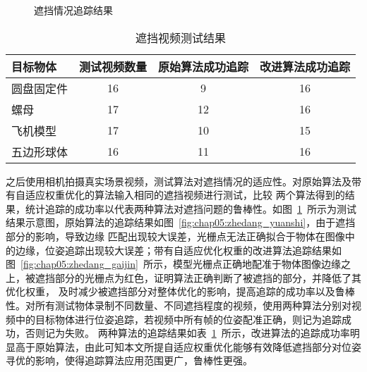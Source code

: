     \begin{figure}[t] %
        \centering%
          \vskip0.3cm
        \caption{遮挡情况追踪结果}
        \label{fig:chap05:result_zhedang_diff}
        \end{figure}
    
        \begin{table}[t]
            \centering
            \caption{遮挡视频测试结果}
            \label{table:chap05:track_able_rate}
            \begin{tabular}{lccc}
                \toprule
                目标物体 &  测试视频数量 & 原始算法成功追踪   &改进算法成功追踪 \\
                \midrule
                圆盘固定件   & 16 & 9 & 16 \\ 
                螺母  & 17 & 12 & 16 \\ 
                飞机模型  & 17 & 10 & 15 \\ 
                五边形球体  & 16 & 11 & 16 \\ 
                \bottomrule
            \end{tabular}
            \end{table}

之后使用相机拍摄真实场景视频，测试算法对遮挡情况的适应性。对原始算法及带有自适应权重优化的算法输入相同的遮挡视频进行测试，比较
两个算法得到的结果，统计追踪的成功率以代表两种算法对遮挡问题的鲁棒性。如图~\ref{fig:chap05:result_zhedang_diff}~所示为测试结果示意图，原始算法的追踪结果如图~\ref{fig:chap05:zhedang_yuanshi}，由于遮挡部分的影响，导致边缘
匹配出现较大误差，光栅点无法正确拟合于物体在图像中的边缘，位姿追踪出现较大误差；带有自适应优化权重的改进算法追踪结果如图~\ref{fig:chap05:zhedang_gaijin}~所示，模型光栅点正确地配准于物体图像边缘之上，被遮挡部分的光栅点为红色，证明算法正确判断了被遮挡的部分，并降低了其优化权重，
及时减少被遮挡部分对整体优化的影响，提高追踪的成功率以及鲁棒性。对所有测试物体录制不同数量、不同遮挡程度的视频，使用两种算法分别对视频中的目标物体进行位姿追踪，若视频中所有帧的位姿配准正确，则记为追踪成功，否则记为失败。
两种算法的追踪结果如表~\ref{table:chap05:track_able_rate}~所示，改进算法的追踪成功率明显高于原始算法，由此可知本文所提自适应权重优化能够有效降低遮挡部分对位姿寻优的影响，使得追踪算法应用范围更广，鲁棒性更强。




